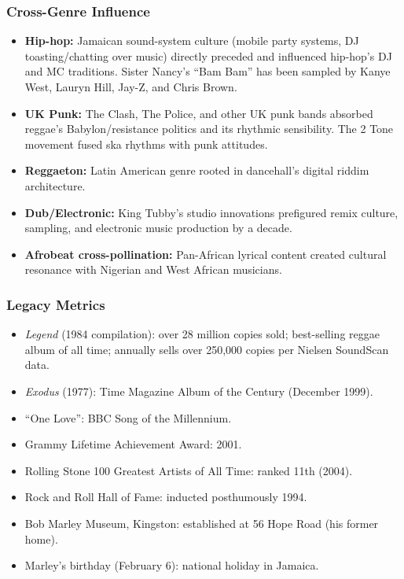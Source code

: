 \documentclass[11pt,letterpaper]{article}
\begin{document}
\subsubsection{Cross-Genre Influence}

\begin{itemize}[noitemsep]
  \item \textbf{Hip-hop:} Jamaican sound-system culture (mobile party systems, DJ toasting/chatting over music) directly preceded and influenced hip-hop's DJ and MC traditions. Sister Nancy's ``Bam Bam'' has been sampled by Kanye West, Lauryn Hill, Jay-Z, and Chris Brown.
  \item \textbf{UK Punk:} The Clash, The Police, and other UK punk bands absorbed reggae's Babylon/resistance politics and its rhythmic sensibility. The 2 Tone movement fused ska rhythms with punk attitudes.
  \item \textbf{Reggaeton:} Latin American genre rooted in dancehall's digital riddim architecture.
  \item \textbf{Dub/Electronic:} King Tubby's studio innovations prefigured remix culture, sampling, and electronic music production by a decade.
  \item \textbf{Afrobeat cross-pollination:} Pan-African lyrical content created cultural resonance with Nigerian and West African musicians.
\end{itemize}

\subsubsection{Legacy Metrics}

\begin{itemize}[noitemsep]
  \item \textit{Legend} (1984 compilation): over 28 million copies sold; best-selling reggae album of all time; annually sells over 250,000 copies per Nielsen SoundScan data.
  \item \textit{Exodus} (1977): Time Magazine Album of the Century (December 1999).
  \item ``One Love'': BBC Song of the Millennium.
  \item Grammy Lifetime Achievement Award: 2001.
  \item Rolling Stone 100 Greatest Artists of All Time: ranked 11th (2004).
  \item Rock and Roll Hall of Fame: inducted posthumously 1994.
  \item Bob Marley Museum, Kingston: established at 56 Hope Road (his former home).
  \item Marley's birthday (February 6): national holiday in Jamaica.
\end{itemize}
\end{document}
